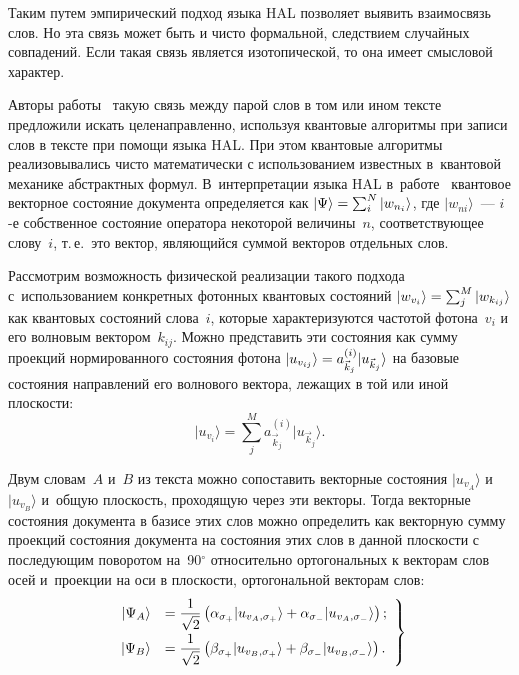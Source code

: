 \begin{multicols}{2}
    Таким путем эмпирический подход языка HAL позволяет выявить 
взаимосвязь слов. Но эта связь может быть и чисто формальной, следствием 
случайных совпадений. Если такая связь является изотопической, то она имеет 
смысловой характер. 
    
    Авторы работы~\cite{6-an} такую связь между парой слов в том или ином 
текс\-те предложили искать целенаправленно, используя квантовые алгоритмы 
при записи слов в текс\-те при помощи языка HAL. При этом квантовые 
алгоритмы реализовывались чис\-то математически с использованием известных 
в~квантовой механике абстрактных формул. В~интерпретации языка HAL 
в~работе~\cite{6-an} квантовое векторное со\-сто\-яние документа определяется 
как $\vert \Psi\rangle \hm= \sum\nolimits_i^N \vert w_{n_i}\rangle$, где $\vert 
w_{ni}\rangle$~--- $i$-е собственное со\-сто\-яние оператора некоторой 
величины~$n$, со\-от\-вет\-ст\-ву\-ющее слову~$i$, т.\,е.\ это вектор, яв\-ля\-ющий\-ся 
суммой векторов отдельных слов.
    
    Рассмотрим возможность физической реализации такого подхода 
с~использованием конкретных фотонных квантовых со\-сто\-яний $\vert 
w_{v_i}\rangle\hm=\sum\nolimits_j^M \vert w_{k_{ij}}\rangle$ как квантовых 
со\-сто\-яний слова~$i$, которые характеризуются час\-то\-той фотона~$v_i$ и его 
вол\-но\-вым вектором~$k_{ij}$. Можно представить эти со\-сто\-яния как сумму 
проекций нормированного со\-сто\-яния фотона $\vert u_{v_{ij}}\rangle \hm= 
a^{(i)}_{\vec{k}_j} \vert u_{\vec{k}_j}\rangle$  на базовые со\-сто\-яния 
на\-прав\-ле\-ний его волнового век\-то\-ра, лежащих в той или иной плос\-кости: 
$$
\vert  u_{v_i}\rangle = \sum\limits_j^M a^{(i)}_{\vec{k}_j} \vert 
u_{\vec{k}_j}\rangle.
$$
    
    Двум словам~$A$ и~$B$ из текста можно сопоставить векторные 
состояния $\vert u_{v_A}\rangle$ и~$\vert u_{v_B}\rangle$  и~об\-щую плос\-кость, 
проходящую через эти векторы. Тогда векторные со\-сто\-яния документа в базисе 
этих слов мож\-но определить как векторную сумму проекций состояния 
документа на со\-сто\-яния этих слов в данной плос\-кости с последующим 
поворотом на~90$^\circ$ относительно ортогональных к векторам слов осей 
и~проекции на оси в плос\-кости, ортогональной векторам слов:
    \begin{equation}
    \left.
    \begin{array}{rl}
    \vert \Psi_A\rangle &= \displaystyle\frac{\displaystyle 1\mathstrut}{\displaystyle \sqrt{2}\mathstrut}\left( \alpha_{\sigma_+}\vert 
u_{v_A,\sigma_+} \rangle +\alpha_{\sigma_-}\vert u_{v_A,\sigma_-}\rangle\right);\\[6pt]
    \vert \Psi_B\rangle &= \displaystyle\frac{\displaystyle 1\mathstrut}{\displaystyle \sqrt{2}\mathstrut}\left( \beta_{\sigma_+}\vert 
u_{v_B,\sigma_+} \rangle +\beta_{\sigma_-}\vert u_{v_B,\sigma_-}\rangle\right).
\end{array}
\right\}
    \label{e2-an}
    \end{equation}
    

\end{multicols}
